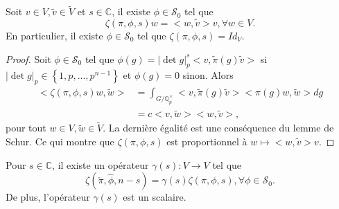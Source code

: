 \begin{lemme}
Soit $v \in V, \tilde{v} \in \tilde{V}$ et $s \in \mathbb{C}$, il existe $\phi \in \mathcal{S}_0$ tel que
\begin{equation}
\zeta(\pi,\phi,s)w = <w,\tilde{v}>v, \forall w \in V.
\end{equation}
En particulier, il existe $\phi \in \mathcal{S}_0$ tel que $\zeta(\pi, \phi, s) = Id_V.$
\end{lemme}

\begin{proof}
Soit $\phi \in \mathcal{S}_0$ tel que $\phi(g) = |\det g|_p^s<v, \tilde{\pi}(g)\tilde{v}>$ si $|\det g|_p \in \left\lbrace 1, p, ..., p^{n-1} \right\rbrace$ et $\phi(g) = 0$ sinon. Alors
\begin{align}
<\zeta(\pi,\phi,s)w,\tilde{w}> &= \int_{G/\mathbb{Q}_p^\times} <v,\tilde{\pi}(g)\tilde{v}><\pi(g)w,\tilde{w}>dg \\
&= c <v, \tilde{w}><w,\tilde{v}>,
\end{align}
pour tout $w \in V, \tilde{w} \in \tilde{V}$. La dernière égalité est une conséquence du lemme de Schur. Ce qui montre que $\zeta(\pi, \phi,s)$ est proportionnel à $w \mapsto <w,\tilde{v}>v$.
\end{proof}

\begin{proposition}
Pour $s \in \mathbb{C}$, il existe un opérateur $\gamma(s) : V \rightarrow V$ tel que
\begin{equation}
\zeta(\check{\pi}, \hat{\phi}, n-s) = \gamma(s)\zeta(\pi,\phi,s), \forall \phi \in \mathcal{S}_0.
\end{equation}
De plus, l'opérateur $\gamma(s)$ est un scalaire.
\end{proposition}


